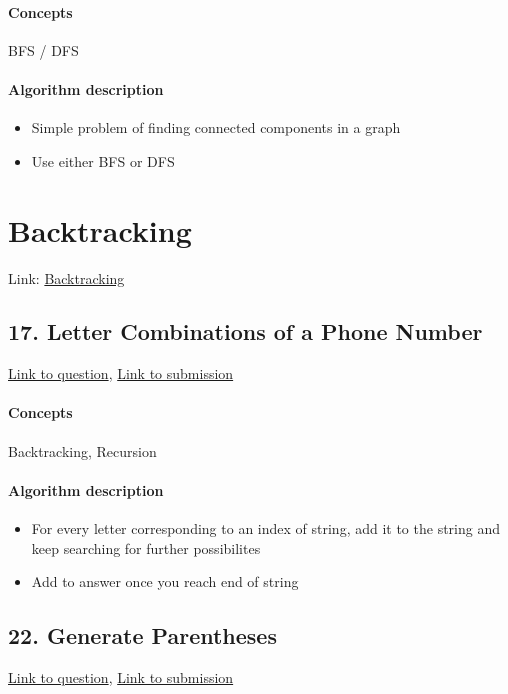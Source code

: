 \documentclass[11pt]{book}
\begin{document}
\paragraph{Concepts}
BFS / DFS
\paragraph{Algorithm description}
\begin{itemize}
    \item Simple problem of finding connected components in a graph
    \item Use either BFS or DFS
\end{itemize}

\section{Backtracking}
Link: \href{https://leetcode.com/explore/interview/card/top-interview-questions-medium/109/backtracking/}{Backtracking}

\subsection{17. Letter Combinations of a Phone Number}
\href{https://leetcode.com/problems/letter-combinations-of-a-phone-number/}{Link to question},
\href{https://leetcode.com/submissions/detail/338717840/}{Link to submission}
\paragraph{Concepts}
Backtracking, Recursion
\paragraph{Algorithm description}
\begin{itemize}
    \item For every letter corresponding to an index of string, add it to the string and keep searching for further possibilites
    \item Add to answer once you reach end of string
\end{itemize}

\subsection{22. Generate Parentheses}
\href{https://leetcode.com/problems/generate-parentheses/}{Link to question},
\href{https://leetcode.com/submissions/detail/338719320/}{Link to submission}
\end{document}
